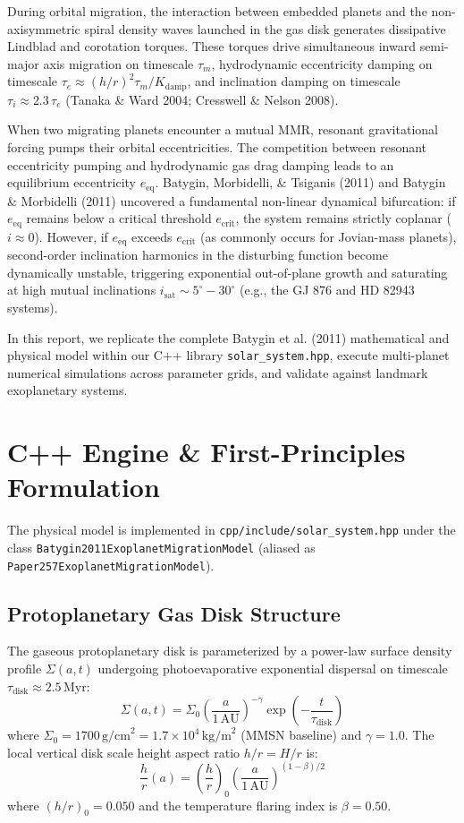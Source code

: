 \documentclass[11pt,a4paper]{article}
\begin{document}
During orbital migration, the interaction between embedded planets and the non-axisymmetric spiral density waves launched in the gas disk generates dissipative Lindblad and corotation torques. These torques drive simultaneous inward semi-major axis migration on timescale $\tau_m$, hydrodynamic eccentricity damping on timescale $\tau_e \approx (h/r)^2 \tau_m / K_{\text{damp}}$, and inclination damping on timescale $\tau_i \approx 2.3\,\tau_e$ (Tanaka \& Ward 2004; Cresswell \& Nelson 2008). 

When two migrating planets encounter a mutual MMR, resonant gravitational forcing pumps their orbital eccentricities. The competition between resonant eccentricity pumping and hydrodynamic gas drag damping leads to an equilibrium eccentricity $e_{\text{eq}}$. Batygin, Morbidelli, \& Tsiganis (2011) and Batygin \& Morbidelli (2011) uncovered a fundamental non-linear dynamical bifurcation: if $e_{\text{eq}}$ remains below a critical threshold $e_{\text{crit}}$, the system remains strictly coplanar ($i \approx 0$). However, if $e_{\text{eq}}$ exceeds $e_{\text{crit}}$ (as commonly occurs for Jovian-mass planets), second-order inclination harmonics in the disturbing function become dynamically unstable, triggering exponential out-of-plane growth and saturating at high mutual inclinations $i_{\text{sat}} \sim 5^\circ - 30^\circ$ (e.g., the GJ 876 and HD 82943 systems).

In this report, we replicate the complete Batygin et al. (2011) mathematical and physical model within our C++ library \texttt{solar\_system.hpp}, execute multi-planet numerical simulations across parameter grids, and validate against landmark exoplanetary systems.

\section{C++ Engine \& First-Principles Formulation}
The physical model is implemented in \texttt{cpp/include/solar\_system.hpp} under the class \texttt{Batygin2011Exoplanet}\-\texttt{MigrationModel} (aliased as \texttt{Paper257ExoplanetMigrationModel}).

\subsection{Protoplanetary Gas Disk Structure}
The gaseous protoplanetary disk is parameterized by a power-law surface density profile $\Sigma(a, t)$ undergoing photoevaporative exponential dispersal on timescale $\tau_{\text{disk}} \approx 2.5\,\text{Myr}$:
\begin{equation}
\Sigma(a, t) = \Sigma_0 \left(\frac{a}{1\,\text{AU}}\right)^{-\gamma} \exp\left(-\frac{t}{\tau_{\text{disk}}}\right)
\label{eq:sigma}
\end{equation}
where $\Sigma_0 = 1700\,\text{g/cm}^2 = 1.7 \times 10^4\,\text{kg/m}^2$ (MMSN baseline) and $\gamma = 1.0$. The local vertical disk scale height aspect ratio $h/r = H/r$ is:
\begin{equation}
\frac{h}{r}(a) = \left(\frac{h}{r}\right)_0 \left(\frac{a}{1\,\text{AU}}\right)^{(1-\beta)/2}
\label{eq:hoverr}
\end{equation}
where $(h/r)_0 = 0.050$ and the temperature flaring index is $\beta = 0.50$.
\end{document}
